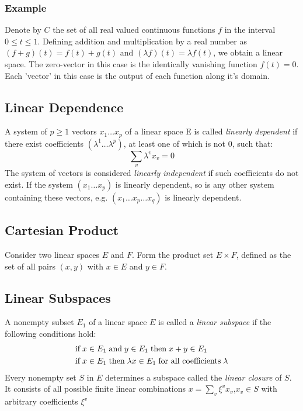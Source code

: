 \documentclass{article}
\begin{document}
\subsubsection{Example}
Denote by \(C\) the set of all real valued continuous functions \(f\) in the interval \(0\leq t\leq 1\). Defining addition and multiplication by a real number as \((f+g)(t)=f(t)+g(t)\) and \((\lambda f)(t)=\lambda f(t)\), we obtain a linear space. The zero-vector in this case is the identically vanishing function \(f(t)=0\). Each 'vector' in this case is the output of each function along it's domain.
\subsection{Linear Dependence}
A system of \(p\geq 1\) vectors \(x_1\ldots x_p\) of a linear space E is called \emph{linearly dependent} if there exist coefficients \((\lambda^{1}\ldots \lambda^{p})\), at least one of which is not 0, such that:
\begin{displaymath}
	\sum_{v}\lambda^{v}x_v=0
\end{displaymath}
The system of vectors is considered \emph{linearly independent} if such coefficients do not exist. If the system \((x_1\ldots x_p)\) is linearly dependent, so is any other system containing these vectors, e.g. \((x_1\ldots x_p\ldots x_q)\) is linearly dependent.
\subsection{Cartesian Product}
Consider two linear spaces \(E\) and \(F\). Form the product set \(E\times F\), defined as the set of all pairs \((x,y)\) with \(x\in E\) and \(y\in F\).
\subsection{Linear Subspaces}
A nonempty subset \(E_1\) of a linear space \(E\) is called a \emph{linear subspace} if the following conditions hold:
\begin{align*}
	&\text{if\;} x\in E_1 \text{\;and\;} y\in E_1 \text{\;then\;} x+y\in E_1\\
	&\text{if\;} x\in E_1 \text{\;then\;}\lambda x\in E_1\text{\;for all coefficients\;}\lambda
\end{align*}
Every nonempty set \(S\) in \(E\) determines a subspace called the \emph{linear closure} of \(S\). It consists of all possible finite linear combinations \(x=\sum_{v}\xi^{v}x_v\),\;\(x_v\in S\) with arbitrary coefficients \(\xi^v\)
\end{document}
